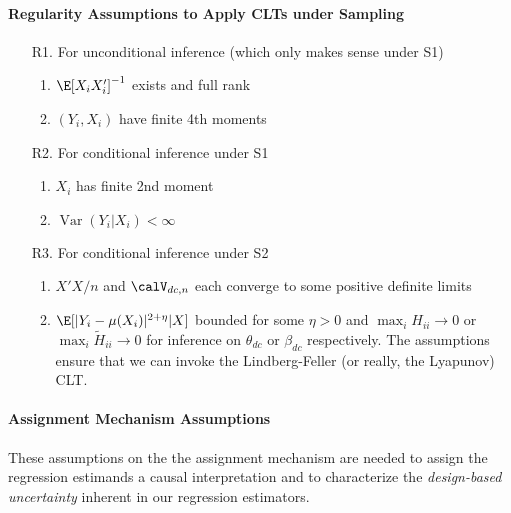 \documentclass[12pt]{article}
\theoremstyle{plain}
\theoremstyle{definition}
\theoremstyle{remark}
\newcommand{\ra}{\rightarrow}
\newcommand{\Var}{\operatorname{Var}}
\begin{document}
\paragraph{Regularity Assumptions to Apply CLTs under Sampling}
\begin{enumerate}
  \item[R1.] For unconditional inference
    (which only makes sense under S1)
    \begin{enumerate}[label=(\roman*)]
      \item $\E[X_iX_i']^{-1}$ exists and full rank
      \item $(Y_i,X_i)$ have finite 4th moments
    \end{enumerate}
  \item[R2.] For conditional inference under S1
    \begin{enumerate}[label=(\roman*)]
      \item $X_i$ has finite 2nd moment
      \item $\Var(Y_i|X_i)<\infty$
    \end{enumerate}
  \item[R3.] For conditional inference under S2
    \begin{enumerate}[label=(\roman*)]
      \item $X'X/n$ and $\calV_{dc,n}$ each converge to some positive
        definite limits
      \item $\E[|Y_i-\mu(X_i)|^{2+\eta}|X]$ bounded for some $\eta>0$
        and
        $\max_i H_{ii}\ra 0$ or $\max_i \tilde{H}_{ii}\ra 0$
        for inference on $\theta_{dc}$ or $\beta_{dc}$ respectively.
        The assumptions ensure that we can invoke the Lindberg-Feller
        (or really, the Lyapunov) CLT.
    \end{enumerate}
\end{enumerate}

\clearpage
\paragraph{Assignment Mechanism Assumptions}
These assumptions on the the assignment mechanism are needed to assign
the regression estimands a causal interpretation and to characterize the
\emph{design-based uncertainty} inherent in our regression estimators.
\end{document}
